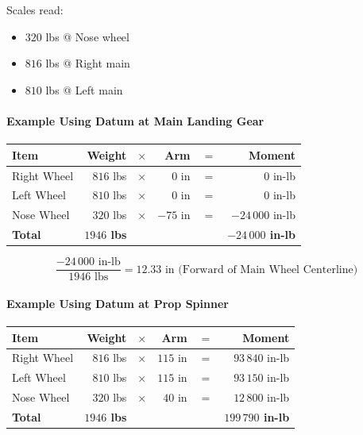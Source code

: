 \documentclass[
]{book}
\providecommand{\tightlist}{%
  \setlength{\itemsep}{0pt}\setlength{\parskip}{0pt}}
\begin{document}
Scales read:

\begin{itemize}
\tightlist
\item
  \(320\) lbs @ Nose wheel
\item
  \(816\) lbs @ Right main
\item
  \(810\) lbs @ Left main
\end{itemize}

\hypertarget{example-using-datum-at-main-landing-gear}{%
\paragraph*{Example Using Datum at Main Landing Gear}\label{example-using-datum-at-main-landing-gear}}

\begin{longtable}[]{@{}lrrrrr@{}}
\toprule
Item & Weight & \(\times\) & Arm & \(=\) & Moment\tabularnewline
\midrule
\endhead
Right Wheel & \(816\) lbs & \(\times\) & \(0\) in & \(=\) & \(0\) in-lb\tabularnewline
Left Wheel & \(810\) lbs & \(\times\) & \(0\) in & \(=\) & \(0\) in-lb\tabularnewline
Nose Wheel & \(320\) lbs & \(\times\) & \(-75\) in & \(=\) & \(-24\,000\) in-lb\tabularnewline
\textbf{Total} & \textbf{\(1946\) lbs} & & & & \textbf{\(-24\,000\) in-lb}\tabularnewline
\bottomrule
\end{longtable}

\[\frac{-24\,000 \text{ in-lb}}{1946 \text{ lbs}} = 12.33 \text{ in (Forward of Main Wheel Centerline)} \]

\hypertarget{example-using-datum-at-prop-spinner}{%
\paragraph*{Example Using Datum at Prop Spinner}\label{example-using-datum-at-prop-spinner}}

\begin{longtable}[]{@{}lrrrrr@{}}
\toprule
Item & Weight & \(\times\) & Arm & \(=\) & Moment\tabularnewline
\midrule
\endhead
Right Wheel & \(816\) lbs & \(\times\) & \(115\) in & \(=\) & \(93\,840\) in-lb\tabularnewline
Left Wheel & \(810\) lbs & \(\times\) & \(115\) in & \(=\) & \(93\,150\) in-lb\tabularnewline
Nose Wheel & \(320\) lbs & \(\times\) & \(40\) in & \(=\) & \(12\,800\) in-lb\tabularnewline
\textbf{Total} & \textbf{\(1946\) lbs} & & & & \textbf{\(199\,790\) in-lb}\tabularnewline
\bottomrule
\end{longtable}
\end{document}
